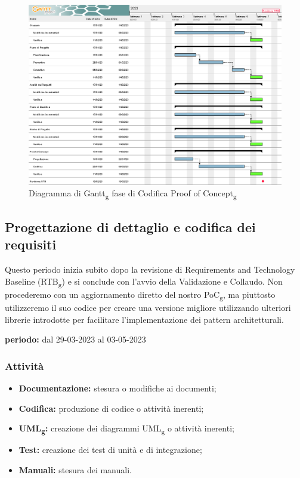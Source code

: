 \begin{figure}[H]
    \centering
    \includegraphics[scale=0.56]{image/gantt_terzo_periodo.png}
    \caption{Diagramma di Gantt\textsubscript{g} fase di Codifica Proof of Concept\textsubscript{g}}
\end{figure}
\pagebreak

\subsection{Progettazione di dettaglio e codifica dei requisiti}
Questo periodo inizia subito dopo la revisione di Requirements and Technology Baseline (RTB\textsubscript{g}) e si conclude con l'avvio della Validazione e Collaudo. Non procederemo con un aggiornamento diretto del nostro PoC\textsubscript{g}, ma piuttosto utilizzeremo il suo codice per creare una versione migliore utilizzando ulteriori librerie introdotte per facilitare l’implementazione dei pattern architetturali.
\begin{center}
\textbf{periodo:} dal 29-03-2023 al 03-05-2023\\
\end{center}
\subsubsection{Attività}
\begin{itemize}
\item \textbf{Documentazione:} stesura o modifiche ai documenti;
\item \textbf{Codifica:} produzione di codice o attività inerenti;
\item \textbf{UML\textsubscript{g}:} creazione dei diagrammi UML\textsubscript{g} o attività inerenti;  
\item \textbf{Test:} creazione dei test di unità e di integrazione;
\item \textbf{Manuali:} stesura dei manuali.
\end{itemize}
